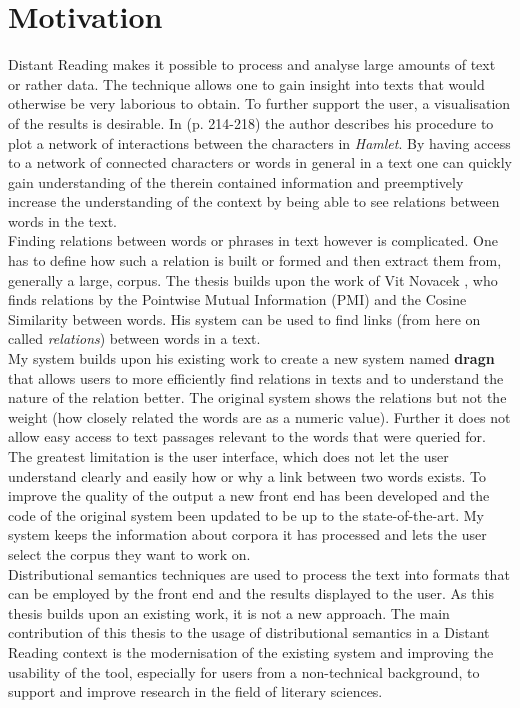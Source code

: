 \section{Motivation}
Distant Reading makes it possible to process and analyse large amounts of text or rather data. The technique allows one to gain insight into texts that would otherwise be very laborious to obtain. To further support the user, a visualisation of the results is desirable. In \cite{moretti13} (p. 214-218) the author describes his procedure to plot a network of interactions between the characters in \textit{Hamlet}.
By having access to a network of connected characters or words in general in a text one can quickly gain understanding of the therein contained information and preemptively increase the understanding of the context by being able to see relations between words in the text.\\
Finding relations between words or phrases in text however is complicated. One has to define how such a relation is built or formed and then extract them from, generally a large, corpus. The thesis builds upon the  work of Vit Novacek \cite{novavcek2014skimmr}, who finds relations by the Pointwise Mutual Information (PMI) and the Cosine Similarity between words. His system can be used to find links (from here on called \textit{relations}) between words in a text.\\
My system builds upon his existing work to create a new system named \textbf{dragn} that allows users to more efficiently find relations in texts and to understand the nature of the relation better. The original system shows the relations but not the weight (how closely related the words are as a numeric value). Further it does not allow easy access to text passages relevant to the words that were queried for. The greatest limitation is the user interface, which does not let the user understand clearly and easily how or why a link between two words exists. To improve the quality of the output a new front end has been developed and the code of the original system been updated to be up to the state-of-the-art. My system keeps the information about corpora it has processed and lets the user select the corpus they want to work on.\\
Distributional semantics techniques are used to process the text into formats that can be employed by the front end and the results displayed to the user. As this thesis builds upon an existing work, it is not a new approach. The main contribution of this thesis to the usage of distributional semantics in a Distant Reading context is the modernisation of the existing system and improving the usability of the tool, especially for users from a non-technical background, to support and improve research in the field of literary sciences.\\
